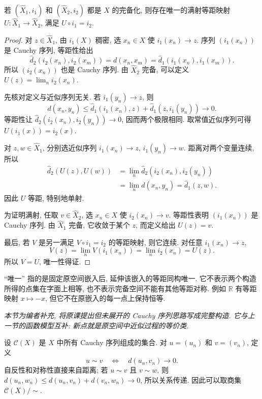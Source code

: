 \begin{theorem}\label{thm:completion-unique}
若 $(\widehat X_1,i_1)$ 和 $(\widehat X_2,i_2)$ 都是 $X$ 的完备化, 则存在唯一的满射等距映射
$U:\widehat X_1\to\widehat X_2$, 满足 $U\circ i_1=i_2$.
\end{theorem}
\begin{proof}
对 $z\in\widehat X_1$, 由 $i_1(X)$ 稠密, 选 $x_n\in X$ 使
$i_1(x_n)\to z$. 序列 $(i_1(x_n))$ 是 Cauchy 序列, 等距性给出
\[
\widehat d_2(i_2(x_n),i_2(x_m))
=d(x_n,x_m)
=\widehat d_1(i_1(x_n),i_1(x_m)).
\]
所以 $(i_2(x_n))$ 也是 Cauchy 序列. 由 $\widehat X_2$ 完备, 可以定义
$U(z)=\lim_ni_2(x_n)$.

先核对定义与近似序列无关. 若 $i_1(y_n)\to z$, 则
\[
d(x_n,y_n)\leq\widehat d_1(i_1(x_n),z)
                 +\widehat d_1(z,i_1(y_n))\longrightarrow0.
\]
等距性让 $\widehat d_2(i_2(x_n),i_2(y_n))\to0$, 因而两个极限相同. 取常值近似序列可得 $U(i_1(x))=i_2(x)$.

对 $z,w\in\widehat X_1$, 分别选近似序列 $i_1(x_n)\to z$, $i_1(y_n)\to w$. 距离对两个变量连续, 所以
\begin{align*}
\widehat d_2(U(z),U(w))
&=\lim_n\widehat d_2(i_2(x_n),i_2(y_n))\\
&=\lim_n d(x_n,y_n)=\widehat d_1(z,w).
\end{align*}
因此 $U$ 等距, 特别地单射.

为证明满射, 任取 $v\in\widehat X_2$, 选 $x_n\in X$ 使 $i_2(x_n)\to v$. 等距性表明 $(i_1(x_n))$ 是 Cauchy 序列. 由 $\widehat X_1$ 完备, 它收敛于某个 $z$, 而定义给出 $U(z)=v$.

最后, 若 $V$ 是另一满足 $V\circ i_1=i_2$ 的等距映射, 则它连续. 对任意 $i_1(x_n)\to z$,
\[
V(z)=\lim_nV(i_1(x_n))=\lim_ni_2(x_n)=U(z).
\]
所以 $V=U$, 唯一性得证.
\end{proof}

\begin{remark}
``唯一'' 指的是固定原空间嵌入后, 延伸该嵌入的等距同构唯一. 它不表示两个构造所得的点集在字面上相等, 也不表示完备空间不能有其他等距对称. 例如 $\mathbb R$ 有等距映射 $x\mapsto-x$, 但它不在原嵌入的每一点上保持恒等.
\end{remark}


\emph{本节为编者补充, 将原课提出但未展开的 Cauchy 序列思路写成完整构造. 它与上一节的函数模型互补: 新点就是原空间中近似过程的等价类.}

设 $\mathcal C(X)$ 是 $X$ 中所有 Cauchy 序列组成的集合. 对 $u=(u_n)$ 和 $v=(v_n)$, 定义
\[
u\sim v\quad\Longleftrightarrow\quad d(u_n,v_n)\longrightarrow0.
\]
自反性和对称性直接来自距离; 若 $u\sim v$ 且 $v\sim w$, 则
$d(u_n,w_n)\leq d(u_n,v_n)+d(v_n,w_n)\to0$, 所以关系传递. 因此可以取商集 $\mathcal C(X)/\!\sim$.

